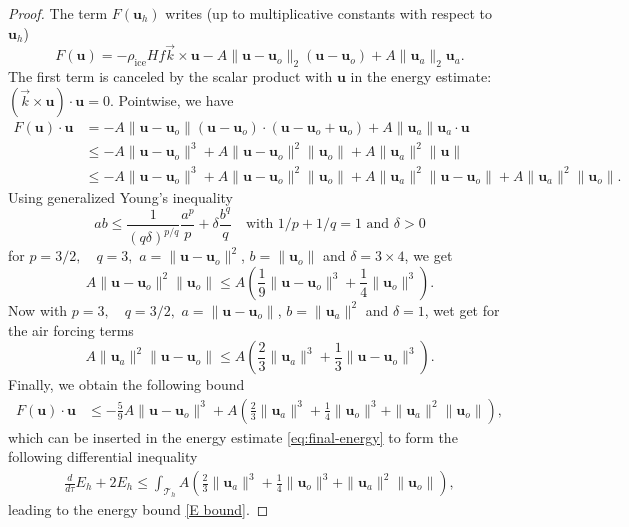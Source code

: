 \documentclass[11pt]{article}
\newcommand{\bu}{\mathbf{u}}
\begin{document}
\begin{proof}
The term $F(\bu_h)$ writes (up to multiplicative constants with respect to $\bu_h$)
\begin{equation}
    F(\bu) = - \rho_\text{ice} H f\vec k \times \bu - A \|\bu - \bu_o\|_2 (\bu - \bu_o) + A \|\bu_a\|_2 \bu_a.
\end{equation}The first term is canceled by the scalar product with $\bu$ in the energy estimate: $(\vec k \times \bu) \cdot  \bu = 0$. Pointwise, we have
\begin{equation}
    \begin{aligned}
        F(\bu) \cdot \bu &= - A\|\bu - \bu_o\| (\bu-\bu_o)\cdot (\bu-\bu_o + \bu_o) + A \|\bu_a\| \bu_a \cdot \bu\\
        &\leq - A\|\bu - \bu_o\|^3 + A\|\bu - \bu_o\|^2 \|\bu_o\| + A \|\bu_a\|^2 \|\bu\|\\
        & \leq - A\|\bu - \bu_o\|^3 + A\|\bu - \bu_o\|^2 \|\bu_o\| +A \|\bu_a\|^2 \|\bu-\bu_o\| +A \|\bu_a\|^2\|\bu_o\|.
    \end{aligned}
\end{equation}Using generalized Young's inequality
$$a b \leq \frac{1}{(q\delta)^{p/q}}\frac{a^p}{p} + \delta\frac{b^q}{q} \quad \text{with }1/p + 1/q = 1 \text{ and }\delta>0 $$for 
$p=3/2, \quad q = 3,$ $a= \|\bu - \bu_o\|^2$, $b=\|\bu_o\|$ and $\delta = 3 \times 4$, we get
$$A\|\bu - \bu_o\|^2 \|\bu_o\| \leq A \left ( \frac19 \|\bu -\bu_o\|^3 + \frac14 \|\bu_o\|^3 \right ).
$$Now with $p=3, \quad q = 3/2,$ $a= \|\bu - \bu_o\|$, $b=\|\bu_a\|^2$ and $\delta = 1$, wet get for the air forcing terms
$$A \|\bu_a\|^2 \|\bu-\bu_o\| \leq A \left (\frac{2}{3} \|\bu_a\|^3 + \frac{1}{3}\|\bu-\bu_o\|^3 \right ).
$$Finally, we obtain the following bound
\begin{equation}
    \begin{aligned}
        F(\bu) \cdot \bu & \leq - \frac{5}{9}A\|\bu-\bu_o\|^3 + A \left ( \frac{2}{3}\|\bu_a\|^3 + \frac{1}{4}\|\bu_o\|^3 + \|\bu_a\|^2\|\bu_o\| \right ),
    \end{aligned}
\end{equation}which can be inserted in the energy estimate \eqref{eq:final-energy} to form the following differential inequality
\begin{equation}
    \label{ineq energy 1}
    \begin{aligned}
\frac{d}{d\tau}E_h + 2 E_h
\leq  \int_{\mathcal{T}_h} A\left ( \frac{2}{3}\|\bu_a\|^3 + \frac{1}{4}\|\bu_o\|^3 + \|\bu_a\|^2\|\bu_o\| \right ),
\end{aligned}
\end{equation}leading to the energy bound \eqref{E bound}.
\end{proof}





\printbibliography
\end{document}
